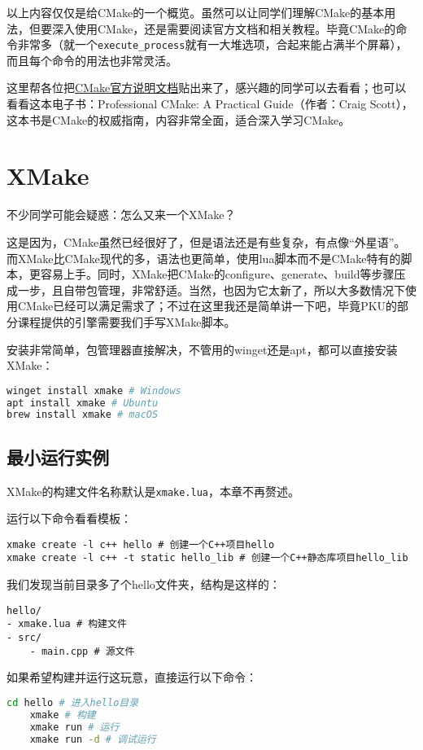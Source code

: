 \documentclass[../main.tex]{subfiles}
\begin{document}
以上内容仅仅是给CMake的一个概览。虽然可以让同学们理解CMake的基本用法，但要深入使用CMake，还是需要阅读官方文档和相关教程。毕竟CMake的命令非常多（就一个\texttt{execute\_process}就有一大堆选项，合起来能占满半个屏幕），而且每个命令的用法也非常灵活。

这里帮各位把\href{https://cmake.org/cmake/help/latest/guide/tutorial/}{CMake官方说明文档}贴出来了，感兴趣的同学可以去看看；也可以看看这本电子书：Professional CMake: A Practical Guide（作者：Craig Scott），这本书是CMake的权威指南，内容非常全面，适合深入学习CMake。

\section{XMake}

不少同学可能会疑惑：怎么又来一个XMake？

这是因为，CMake虽然已经很好了，但是语法还是有些复杂，有点像“外星语”。而XMake比CMake现代的多，语法也更简单，使用lua脚本而不是CMake特有的脚本，更容易上手。同时，XMake把CMake的configure、generate、build等步骤压成一步，且自带包管理，非常舒适。当然，也因为它太新了，所以大多数情况下使用CMake已经可以满足需求了；不过在这里我还是简单讲一下吧，毕竟PKU的部分课程提供的引擎需要我们手写XMake脚本。

安装非常简单，包管理器直接解决，不管用的winget还是apt，都可以直接安装XMake：
\begin{lstlisting}[language=bash]
winget install xmake # Windows
apt install xmake # Ubuntu
brew install xmake # macOS
\end{lstlisting}

\subsection{最小运行实例}

XMake的构建文件名称默认是\texttt{xmake.lua}，本章不再赘述。

运行以下命令看看模板：
\begin{lstlisting}
xmake create -l c++ hello # 创建一个C++项目hello
xmake create -l c++ -t static hello_lib # 创建一个C++静态库项目hello_lib
\end{lstlisting}

我们发现当前目录多了个hello文件夹，结构是这样的：
\begin{lstlisting}
hello/
- xmake.lua # 构建文件
- src/
    - main.cpp # 源文件
\end{lstlisting}

如果希望构建并运行这玩意，直接运行以下命令：
\begin{lstlisting}[language=bash]
    cd hello # 进入hello目录
    xmake # 构建
    xmake run # 运行
    xmake run -d # 调试运行
\end{lstlisting}
\end{document}
